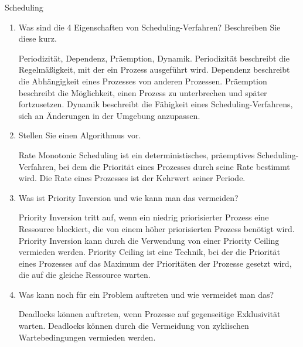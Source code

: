\documentclass{article}
\begin{document}
\begin{exercise}{Scheduling}
  \begin{enumerate}
    \item Was sind die 4 Eigenschaften von Scheduling-Verfahren? Beschreiben Sie diese kurz.

          \begin{solution}
            Periodizität, Dependenz, Präemption, Dynamik.
            Periodizität beschreibt die Regelmäßigkeit, mit der ein Prozess ausgeführt wird.
            Dependenz beschreibt die Abhängigkeit eines Prozesses von anderen Prozessen.
            Präemption beschreibt die Möglichkeit, einen Prozess zu unterbrechen und später fortzusetzen.
            Dynamik beschreibt die Fähigkeit eines Scheduling-Verfahrens, sich an Änderungen in der Umgebung anzupassen.
          \end{solution}

    \item Stellen Sie einen Algorithmus vor.

          \begin{solution}
            Rate Monotonic Scheduling ist ein deterministisches, präemptives Scheduling-Verfahren, bei dem die Priorität eines Prozesses durch seine Rate bestimmt wird. Die Rate eines Prozesses ist der Kehrwert seiner Periode.
          \end{solution}

    \item Was ist Priority Inversion und wie kann man das vermeiden?

          \begin{solution}
            Priority Inversion tritt auf, wenn ein niedrig priorisierter Prozess eine Ressource blockiert, die von einem höher priorisierten Prozess benötigt wird. Priority Inversion kann durch die Verwendung von einer Priority Ceiling vermieden werden.
            Priority Ceiling ist eine Technik, bei der die Priorität eines Prozesses auf das Maximum der Prioritäten der Prozesse gesetzt wird, die auf die gleiche Ressource warten.
          \end{solution}

    \item Was kann noch für ein Problem auftreten und wie vermeidet man das?

          \begin{solution}
            Deadlocks können auftreten, wenn Prozesse auf gegenseitige Exklusivität warten. Deadlocks können durch die Vermeidung von zyklischen Wartebedingungen vermieden werden.
          \end{solution}
  \end{enumerate}
\end{exercise}
\end{document}
